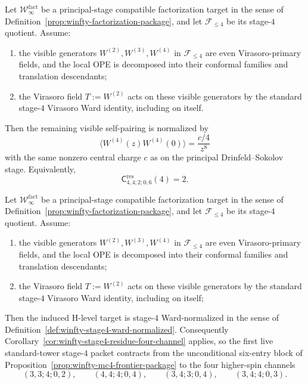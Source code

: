 \begin{conjecture}
\label{conj:winfty-stage4-visible-diagonal-normalization}
\ClaimStatusConjectured{}
Let $\mathcal{W}^{\mathrm{fact}}_\infty$ be a principal-stage
compatible factorization target in the sense of
Definition~\ref{prop:winfty-factorization-package}, and let
$\mathcal{F}_{\le 4}$ be its stage-$4$ quotient.  Assume:
\begin{enumerate}[label=\textup{(\roman*)}]
\item the visible generators $W^{(2)},W^{(3)},W^{(4)}$ in
  $\mathcal{F}_{\le 4}$ are even Virasoro-primary fields, and the local
  OPE is decomposed into their conformal families and translation
  descendants;
\item the Virasoro field $T:=W^{(2)}$ acts on these visible generators
  by the standard stage-$4$ Virasoro Ward identity, including on
  itself.
\end{enumerate}
Then the remaining visible self-pairing is normalized by
\[
\langle W^{(4)}(z)W^{(4)}(0)\rangle = \frac{c/4}{z^{8}}
\]
with the same nonzero central charge $c$ as on the principal
Drinfeld--Sokolov stage.  Equivalently,
\[
\mathsf{C}^{\mathrm{res}}_{4,4;2;0,6}(4)=2.
\]
\end{conjecture}

\begin{conjecture}
\label{conj:winfty-stage4-ward-inheritance}
\ClaimStatusConjectured{}
Let $\mathcal{W}^{\mathrm{fact}}_\infty$ be a principal-stage
compatible factorization target in the sense of
Definition~\ref{prop:winfty-factorization-package}, and let
$\mathcal{F}_{\le 4}$ be its stage-$4$ quotient.  Assume:
\begin{enumerate}[label=\textup{(\roman*)}]
\item the visible generators $W^{(2)},W^{(3)},W^{(4)}$ in
  $\mathcal{F}_{\le 4}$ are even Virasoro-primary fields, and the local
  OPE is decomposed into their conformal families and translation
  descendants;
\item the Virasoro field $T:=W^{(2)}$ acts on these visible generators
  by the standard stage-$4$ Virasoro Ward identity, including on
  itself;
\end{enumerate}
Then the induced H-level target is stage-$4$ Ward-normalized in the
sense of Definition~\ref{def:winfty-stage4-ward-normalized}.  Consequently
Corollary~\ref{cor:winfty-stage4-residue-four-channel} applies, so the
first live standard-tower stage-$4$ packet contracts from the
unconditional six-entry block of
Proposition~\ref{prop:winfty-mc4-frontier-package} to the four
higher-spin channels
\[
(3,3;4;0,2),\qquad
(4,4;4;0,4),\qquad
(3,4;3;0,4),\qquad
(3,4;4;0,3).
\]
\end{conjecture}

